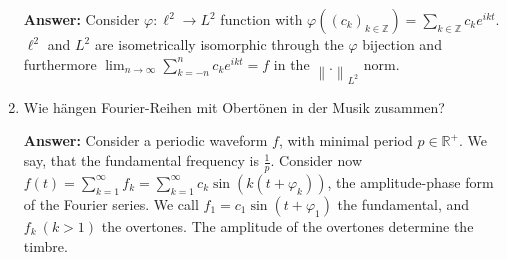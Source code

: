 \documentclass[11pt]{article}
\newcommand{\norm}[1]{\left\lVert#1\right\rVert}
\newcommand{\sumn}[4]{\sum_{#1=#2}^{#3}{#4}}
\newcommand{\RR}[0]{\mathbb{R}}
\newcommand{\ZZ}[0]{\mathbb{Z}}
\begin{document}
\begin{enumerate}
    \textbf{Answer:} Consider $\varphi: \ell^2 \to L^2$ function with $\varphi\left((c_k)_{k \in \ZZ}\right) = \sum_{k\in\ZZ}{c_k e^{ikt}}$. $\ell^2$ and $L^2$ are isometrically isomorphic through the $\varphi$ bijection and furthermore $\lim_{n\to\infty}\sum_{k=-n}^n {c_k e^{ikt}} = f$ in the $\norm{.}_{L^2}$ norm.
    \item Wie hängen Fourier-Reihen mit Obertönen in der Musik zusammen?

    \textbf{Answer:} Consider a periodic waveform $f$, with minimal period $p \in \RR^+$. We say, that the fundamental frequency is $\frac{1}{p}$. Consider now $f(t) = \sumn{k}{1}{\infty}{f_k} = \sumn{k}{1}{\infty}{c_k \sin(k(t + \varphi_k))}$, the amplitude-phase form of the Fourier series. We call $f_1 = c_1 \sin(t + \varphi_1)$ the fundamental, and $f_k~(k > 1)$ the overtones. The amplitude of the overtones determine the timbre.

\end{enumerate}
\end{document}
